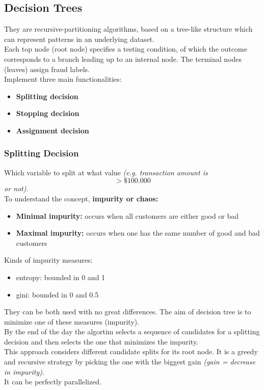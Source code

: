     \subsection{Decision Trees}
        They are recursive-partitioning algorithms, based on a tree-like structure which can represent patterns in an underlying dataset.\\
        Each top node (root node) specifies a testing condition, of which the outcome corresponds to a branch leading up to an internal node. The terminal nodes (leaves) assign fraud labels.\\
        Implement three main functionalities:
        \begin{itemize}
            \item \textbf{Splitting decision}
            \item \textbf{Stopping decision}
            \item \textbf{Assignment decision}
        \end{itemize}
        \subsubsection{Splitting Decision}
            Which variable to split at what value \textit{(e.g. transaction amount is $$>\$100.000$$ or not)}.\\
            To understand the concept, \textbf{impurity or chaos:}
            \begin{itemize}
                \item \textbf{Minimal impurity:} occurs when all customers are either good or bad 
                \item \textbf{Maximal impurity:} occurs when one has the same number of good and bad customers 
            \end{itemize}
            Kinds of impurity measures:
            \begin{itemize}
                \item entropy: bounded in 0 and 1
                \item gini: bounded in 0 and 0.5
            \end{itemize}
            They can be both used with no great differences. The aim of decision tree is to minimize one of these measures (impurity).\\
            By the end of the day the algortim selects a sequence of candidates for a splitting decision and then selects the one that minimizes the impurity.\\
            This approach considers different candidate splits for its root node. It is a greedy and recursive strategy by picking the one with the biggest gain \textit{(gain = decrease in impurity)}.\\
            It can be perfectly parallelized. 
